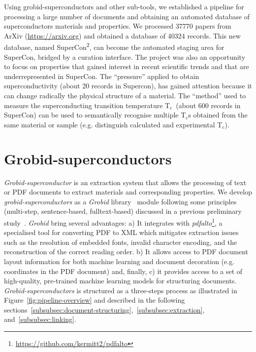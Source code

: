 \documentclass{article}
\newcommand{\tc}{T$_{c}$}
\begin{document}
Using grobid-superconductors and other sub-tools, we established a pipeline for processing a large number of documents and obtaining an automated database of superconductors materials and properties. 
We processed 37770 papers from ArXiv (\url{https://arxiv.org}) and obtained a database of 40324 records. 
This new database, named SuperCon\textsuperscript{2}, can become the automated staging area for SuperCon, bridged by a curation interface. 
The project was also an opportunity to focus on properties that gained interest in recent scientific trends and that are underrepresented in SuperCon. 
The ``pressure'' applied to obtain superconductivity (about 20 records in Supercon), has gained attention because it can change radically the physical structure of a material.
The ``method'' used to measure the superconducting transition temperature \tc~(about 600 records in SuperCon) can be used to semantically recognise multiple \tc s obtained from the same material or sample (e.g. distinguish calculated and experimental \tc). 

\section{Grobid-superconductors}

\textit{Grobid-superconductor} is an extraction system that allows the processing of text or PDF documents to extract materials and corresponding properties. 
We develop \textit{grobid-superconductors} as a \textit{Grobid} library~\cite{GROBID} module following some principles (multi-step, sentence-based, fulltext-based) discussed in a previous preliminary study~\cite{foppiano:hal-02870896}.  
\textit{Grobid} bring several advantages: a) It integrates with \textit{pdfalto}\footnote{\url{https://github.com/kermitt2/pdfalto}}, a specialised tool for converting PDF to XML which mitigates extraction issues such as the resolution of embedded fonts, invalid character encoding, and the reconstruction of the correct reading order. 
b) It allows access to PDF document layout information for both machine learning and document decoration (e.g. coordinates in the PDF document) and, finally, c) it provides access to a set of high-quality, pre-trained machine learning models for structuring documents.
\textit{Grobid-superconductors} is structured as a three-steps process as illustrated in Figure~\ref{fig:pipeline-overview} and described in the following sections~\ref{subsubsec:document-structuring},~\ref{subsubsec:extraction}, and~\ref{subsubsec:linking}.
\end{document}
